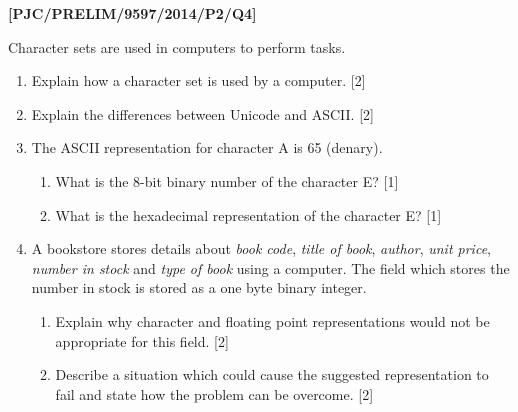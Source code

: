 \item \textbf{{[}PJC/PRELIM/9597/2014/P2/Q4{]} }

Character sets are used in computers to perform tasks. 
\begin{enumerate}
\item Explain how a character set is used by a computer. \hfill{}{[}2{]}
\item Explain the differences between Unicode and ASCII.\hfill{} {[}2{]}
\item The ASCII representation for character A is 65 (denary). 
\begin{enumerate}
\item What is the 8-bit binary number of the character E? \hfill{}{[}1{]}
\item What is the hexadecimal representation of the character E? \hfill{}{[}1{]}
\end{enumerate}
\item A bookstore stores details about \emph{book code}, \emph{title of
book}, \emph{author}, \emph{unit price}, \emph{number in stock} and
\emph{type of book} using a computer. The field which stores the number
in stock is stored as a one byte binary integer.
\begin{enumerate}
\item Explain why character and floating point representations would not
be appropriate for this field. \hfill{}{[}2{]}
\item Describe a situation which could cause the suggested representation
to fail and state how the problem can be overcome.\hfill{} {[}2{]}
\end{enumerate}
\end{enumerate}